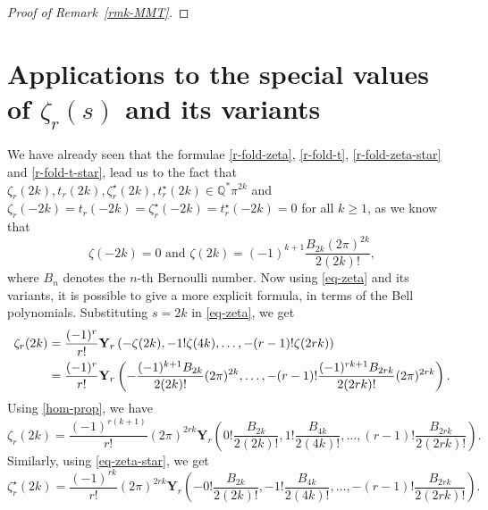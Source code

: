 \documentclass[12pt]{amsart}
\newcommand{\Q}{{\mathbb Q}}
\newcommand{\rmkref}[1]{Remark~\ref{#1}}
\begin{document}
\begin{proof}[Proof of \rmkref{rmk-MMT}]
\end{proof}





\section{Applications to the special values of $\zeta_r(s)$ and its variants}\label{sec-app}
We have already seen that the formulae \eqref{r-fold-zeta},  \eqref{r-fold-t}, \eqref{r-fold-zeta-star} and \eqref{r-fold-t-star}, lead us to the fact that $\zeta_r(2k),t_r(2k),\zeta_r^{\star}(2k),t_r^{\star}(2k) \in \Q^* \pi^{2k}$ and $\zeta_r(-2k)=t_r(-2k)=\zeta_r^{\star}(-2k)=t_r^{\star}(-2k)=0$ for all $k\geq 1$, as we know that
$$\zeta(-2k)=0 \text{ and } \zeta(2k)=(-1)^{k+1}\frac{B_{2k}(2\pi)^{2k}}{2(2k)!},$$ where $B_n$ denotes the $n$-th Bernoulli number. 
Now using \eqref{eq-zeta} and its variants, it is possible to give a more explicit formula, in terms of the Bell polynomials. Substituting $s=2k$ in \eqref{eq-zeta}, we get
\begin{align*}
\zeta_{r}(2k)&=\frac{(-1)^r}{r!}{\bf Y}_r\left(-\zeta(2k), -1!\zeta(4k), \ldots,-(r-1)!\zeta(2rk)\right)\\
&=\frac{(-1)^r}{r!}{\bf Y}_r\left(-\frac{(-1)^{k+1}B_{2k}}{2(2k)!}(2\pi)^{2k},\ldots,-(r-1)!\frac{(-1)^{rk+1}B_{2rk}}{2(2rk)!}(2\pi)^{2rk}\right).
\end{align*}
Using \eqref{hom-prop}, we have
$$
\zeta_r(2k)=\frac{(-1)^{r(k+1)}}{r!}(2\pi)^{2rk}{\mathbf{Y}_r\left(0!\frac{B_{2k}}{2(2k)!}, 1!\frac{B_{4k}}{2(4k)!},\ldots,(r-1)!\frac{B_{2rk}}{2(2rk)!}\right)}.
$$
Similarly, using \eqref{eq-zeta-star}, we get
$$
\zeta^{\star}_r(2k)=\frac{(-1)^{rk}}{r!}(2\pi)^{2rk}{\mathbf{Y}_r\left(-0!\frac{B_{2k}}{2(2k)!}, -1!\frac{B_{4k}}{2(4k)!},\ldots,-(r-1)!\frac{B_{2rk}}{2(2rk)!}\right)}.
$$
\end{document}
